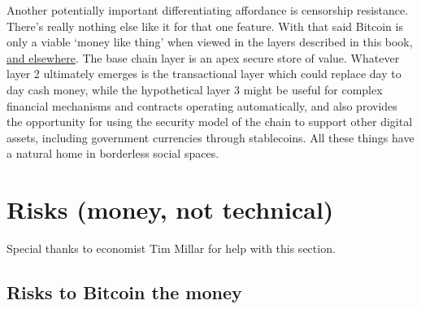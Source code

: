 \begin{itemize}
Another potentially important differentiating affordance is censorship resistance. There's really nothing else like it for that one feature. With that said Bitcoin is only a viable `money like thing' when viewed in the layers described in this book, \href{https://giacomozucco.com/layers-before-bitcoin}{and elsewhere}\cite{Bhatia2021}. The base chain layer is an apex secure store of value. Whatever layer 2 ultimately emerges is the transactional layer which could replace day to day cash money, while the hypothetical layer 3 might be useful for complex financial mechanisms and contracts operating automatically, and also provides the opportunity for using the security model of the chain to support other digital assets, including government currencies through stablecoins. All these things have a natural home in borderless social spaces.
\section{Risks (money, not technical)}
Special thanks to economist Tim Millar for help with this section.
\subsection{Risks to Bitcoin the money}

\end{itemize}
